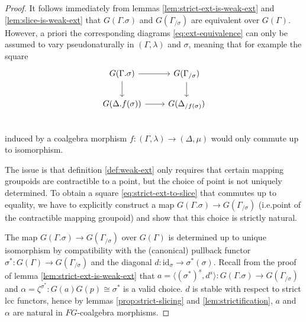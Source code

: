 \documentclass[a4paper]{article}
\theoremstyle{remark}
\theoremstyle{definition}
\begin{document}
\begin{proof}
  It follows immediately from lemmas \ref{lem:strict-ext-is-weak-ext} and \ref{lem:slice-is-weak-ext} that $G(\Gamma.\sigma)$ and $G(\Gamma_{/ \sigma})$ are equivalent over $G(\Gamma)$.
  However, a priori the corresponding diagrams \eqref{eq:ext-equivalence} can only be assumed to vary pseudonaturally in $(\Gamma, \lambda)$ and $\sigma$, meaning that for example the square
  \begin{equation}
    \label{eq:strict-ext-to-slice}
    \begin{tikzcd}
      G(\Gamma.\sigma) \arrow[r] \arrow[d] & G(\Gamma_{/ \sigma}) \arrow[d] \\
      G(\Delta.f(\sigma)) \arrow[r] & G(\Delta_{/ f(\sigma)}) \\
    \end{tikzcd}
  \end{equation}
  induced by a coalgebra morphism $f : (\Gamma, \lambda) \rightarrow (\Delta, \mu)$ would only commute up to isomorphism.

  The issue is that definition \ref{def:weak-ext} only requires that certain mapping groupoids are contractible to a point, but the choice of point is not uniquely determined.
  To obtain a square \eqref{eq:strict-ext-to-slice} that commutes up to equality, we have to explicitly construct a map $G(\Gamma.\sigma) \rightarrow G(\Gamma_{/ \sigma})$ (i.e.\@ point of the contractible mapping groupoid) and show that this choice is strictly natural.

  The map $G(\Gamma.\sigma) \rightarrow G(\Gamma_{/ \sigma})$ over $G(\Gamma)$ is determined up to unique isomorphism by compatibility with the (canonical) pullback functor $\sigma^* : G(\Gamma) \rightarrow G(\Gamma_{/ \sigma})$ and the diagonal $d : \mathrm{id}_\sigma \rightarrow \sigma^*(\sigma)$.
  Recall from the proof of lemma \ref{lem:strict-ext-is-weak-ext} that $a = \langle (\sigma^*)^s, d^s \rangle : G(\Gamma.\sigma) \rightarrow G(\Gamma_{/ \sigma})$ and $\alpha = \zeta^{\sigma^*} : G(a) G(p) \cong \sigma^*$ is a valid choice.
  $d$ is stable with respect to strict lcc functors, hence by lemmas \ref{prop:strict-slicing} and \ref{lem:strictification}, $a$ and $\alpha$ are natural in $FG$-coalgebra morphisms.


\end{proof}
\end{document}
